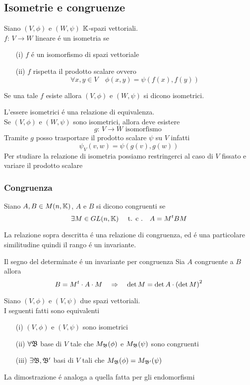 \subsection{Isometrie e congruenze}
\begin{defn}Siano $(V,\phi) $ e $(W,\psi) $ $\mathbb{K}$-spazi vettoriali.\\
 $f:\, V \to W $ lineare \'e un isometria se 
 \begin{itemize}
 \item[(i)]$f$ \'e un isomorfismo di spazi vettoriale
 \item[(ii)]$f$ rispetta il prodotto scalare ovvero
 $$ \forall x, y \in V \quad \phi(x,y)= \psi(f(x), f(y)) $$
 \end{itemize}
\end{defn}
\spazio
\begin{defn} Se una tale $f$ esiste allora $(V,\phi) $ e $(W,\psi) $ si dicono isometrici.
\end{defn}
\begin{oss}
L'essere isometrici \'e una relazione di equivalenza.\\
Se $(V, \phi)$ e $(W, \psi)$ sono isometrici, allora deve esistere
$$ g:\, V \to W \text{ isomorfismo } $$
Tramite $g$ posso trasportare il prodotto scalare $\psi$ su $V$ infatti
$$ \psi_V (v,w) = \psi(g(v), g(w))$$
Per studiare la relazione di isometria possiamo restringerci al caso di $V$ fissato e variare il prodotto scalare
\end{oss}
\spazio

\subsubsection{Congruenza}
\begin{defn}[Congruenza]\bianco
Siano $A,B \in M(n,\mathbb{K})$, $A$ e $B$ si dicono congruenti se 
$$ \exists M \in GL(n,\mathbb{K}) \quad \text{ t. c .} \quad A = M^t B M$$
\end{defn}
\begin{oss}La relazione sopra descritta \'e una relazione di congruenza, ed \'e una particolare similitudine quindi il rango \'e un invariante.
\end{oss}
\begin{prop}Il segno del determinate \'e un invariante per congruenza
\proof Sia $A$ congruente a $B$ allora
$$ B = M^t \cdot A \cdot M \quad \Rightarrow \quad \det M = \det A \cdot \left( \det M \right)^2 $$
\end{prop}
\spazio
\begin{prop}\label{congruenza}Siano $(V,\phi) $ e $(V, \psi)$ due spazi vettoriali.\\
I seguenti fatti sono equivalenti
 \begin{itemize} 
 \item[(i)] $(V,\phi) $ e $ (V, \psi) $ sono isometrici
 \item[(ii)] $\forall \mathfrak{B} $ base di $V$ tale che $ M_{\mathfrak{B}} (\phi) $ e $M_{\mathfrak{B}}(\psi) $ sono congruenti
 \item[(iii)] $\exists \mathfrak{B}, \mathfrak{B}' $ basi di $V $ tali che $M_{\mathfrak{B}} ( \phi) = M_{\mathfrak{B}'}(\psi)$
 \end{itemize}
 La dimostrazione \'e analoga a quella fatta per gli endomorfismi 
 \end{prop}
\newpage


